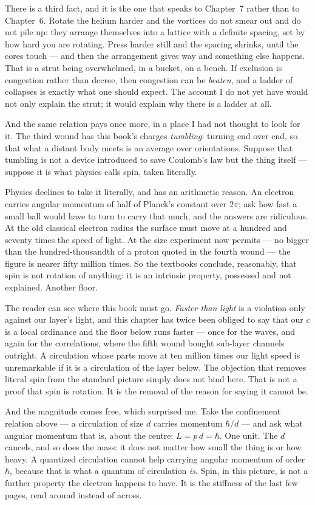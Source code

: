 There is a third fact, and it is the one that speaks to Chapter~7 rather than to Chapter~6. Rotate the helium harder and the vortices do not smear out and do not pile up: they arrange themselves into a lattice with a definite spacing, set by how hard you are rotating. Press harder still and the spacing shrinks, until the cores touch --- and then the arrangement gives way and something else happens. That is a strut being overwhelmed, in a bucket, on a bench. If exclusion is congestion rather than decree, then congestion can be \emph{beaten}, and a ladder of collapses is exactly what one should expect. The account I do not yet have would not only explain the strut; it would explain why there is a ladder at all.

And the same relation pays once more, in a place I had not thought to look for it. The third wound has this book's charges \emph{tumbling}: turning end over end, so that what a distant body meets is an average over orientations. Suppose that tumbling is not a device introduced to save Coulomb's law but the thing itself --- suppose it is what physics calls spin, taken literally.

Physics declines to take it literally, and has an arithmetic reason. An electron carries angular momentum of half of Planck's constant over $2\pi$; ask how fast a small ball would have to turn to carry that much, and the answers are ridiculous. At the old classical electron radius the surface must move at a hundred and seventy times the speed of light. At the size experiment now permits --- no bigger than the hundred-thousandth of a proton quoted in the fourth wound --- the figure is nearer fifty million times. So the textbooks conclude, reasonably, that spin is not rotation of anything: it is an intrinsic property, possessed and not explained. Another floor.

The reader can see where this book must go. \emph{Faster than light} is a violation only against our layer's light, and this chapter has twice been obliged to say that our $c$ is a local ordinance and the floor below runs faster --- once for the waves, and again for the correlations, where the fifth wound bought sub-layer channels outright. A circulation whose parts move at ten million times our light speed is unremarkable if it is a circulation of the layer below. The objection that removes literal spin from the standard picture simply does not bind here. That is not a proof that spin is rotation. It is the removal of the reason for saying it cannot be.

And the magnitude comes free, which surprised me. Take the confinement relation above --- a circulation of size $d$ carries momentum $\hbar/d$ --- and ask what angular momentum that is, about the centre: $L = p\,d = \hbar$. One unit. The $d$ cancels, and so does the mass: it does not matter how small the thing is or how heavy. A quantized circulation cannot help carrying angular momentum of order $\hbar$, because that is what a quantum of circulation \emph{is}. Spin, in this picture, is not a further property the electron happens to have. It is the stiffness of the last few pages, read around instead of across.

